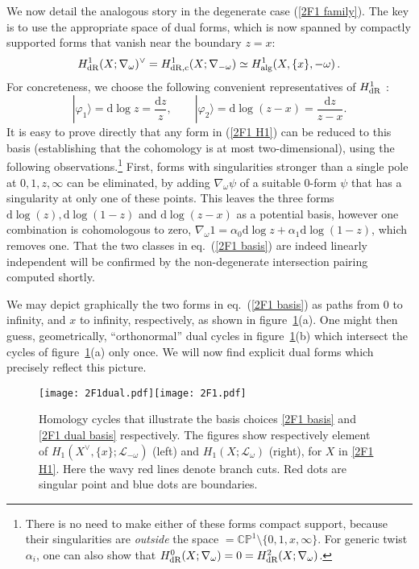 \documentclass[11pt]{article}
\renewcommand{\d}{\text{d}}
\newcommand{\be}{\begin{equation}}
\newcommand{\ee}{\end{equation}}
\newcommand{\ket}[1]{|{#1}\big\rangle}
\newcommand{\dual}{\vee}
\newcommand{\CP}{\mathbb{CP}}
\newcommand{\vphi}{\varphi}
\begin{document}
We now detail the analogous story in the degenerate case (\ref{2F1 family}).
The key is to use the appropriate space of dual forms, which is now spanned by compactly supported forms that vanish near the boundary $z=x$:
\be
 H^1_{\rm dR}(X;\nabla_\omega)^\dual =  H^1_{\rm dR,c}(X;\nabla_{-\omega})\simeq H^1_{\rm alg}(X,\{x\},-\omega)\,.
\ee
For concreteness, we choose the following convenient representatives of $H^1_{\rm dR}$ \cite{Matsumoto:2018aa}:
\be
 	\ket{\vphi_1} = \d\log z=\frac{\d z}{z},
 	\qquad 
	\ket{\vphi_2} = \d\log(z-x) = \frac{\d z}{z-x}. 
	\label{2F1 basis}
\ee
It is easy to prove directly that any form in (\ref{2F1 H1}) can be reduced 
to this basis (establishing that the cohomology is at most two-dimensional),
using the following observations.\footnote{
There is no need to make either of these forms compact support, because their singularities are \emph{outside} the space $=\CP^1\setminus\{0,1,x,\infty\}$. For generic twist $\alpha_i$, one can also show that $H^0_{\rm dR}(X;\nabla_\omega)=0=H^2_{\rm dR}(X;\nabla_\omega)$.
}
First, forms with singularities stronger than a single pole at $0,1,z,\infty$ 
can be eliminated, by adding $\nabla_\omega \psi$ of a suitable 0-form $\psi$
that has a singularity at only one of these points. This leaves the three forms 
$\d\log(z), \d\log(1-z)$ and $\d\log(z-x)$ as a potential basis, however
one combination is cohomologous  to zero, $\nabla_\omega 1 = \alpha_0 \d\log z + \alpha_1 \d\log(1-z)$, which removes one.
That the two classes in eq.~(\ref{2F1 basis}) 
are indeed linearly independent will be confirmed by the non-degenerate 
intersection pairing computed shortly.

We may depict graphically the two forms in eq.~(\ref{2F1 basis}) as paths  from $0$ to infinity, and $x$ to infinity, respectively, as shown in 
figure~\ref{fig:2F1 cycles}(a).  One might then guess, geometrically, ``orthonormal'' 
dual cycles in figure~\ref{fig:2F1 cycles}(b) which intersect the cycles of 
figure~\ref{fig:2F1 cycles}(a) only once.
We will now find explicit dual forms which precisely reflect this picture.

\begin{figure} \centering
\texttt{[image: 2F1dual.pdf]}\qquad\texttt{[image: 2F1.pdf]}
\caption{\label{fig:2F1 cycles}	Homology cycles that illustrate the basis choices \eqref{2F1 basis} and \eqref{2F1 dual basis} respectively.
The figures show respectively element of $H_1(X^\vee,\{x\};\mathcal L_{-\omega})$ (left) and $H_1(X;\mathcal L_\omega)$ (right), for $X$ in \eqref{2F1 H1}.
Here the wavy red lines denote branch cuts.	Red dots are singular point and blue dots are boundaries.}
\end{figure}
\end{document}
